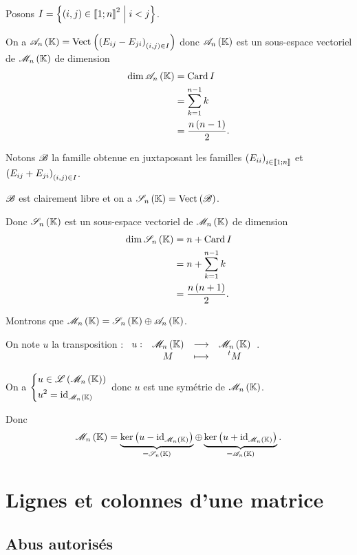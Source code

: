 \begin{dem}
Posons \(I=\left\lbrace\left(i,j\right)\in\left\llbracket1;n\right\rrbracket^2\;\middle|\; i<j\right\rbrace\).

On a \(\antisym{n}=\Vect{\paren{E_{ij}-E_{ji}}_{\paren{i,j}\in I}}\) donc \(\antisym{n}\) est un sous-espace vectoriel de \(\M{n}\) de dimension \[\begin{aligned}
\dim\antisym{n}&=\Card I \\
&=\sum_{k=1}^{n-1}k \\
&=\dfrac{n\paren{n-1}}{2}.
\end{aligned}\]

Notons \(\mathscr{B}\) la famille obtenue en juxtaposant les familles \(\left(E_{ii}\right)_{i\in\left\llbracket1;n\right\rrbracket}\) et \(\left(E_{ij}+E_{ji}\right)_{\left(i,j\right)\in I}\).

\(\mathscr{B}\) est clairement libre et on a \(\sym{n}=\Vect{\fami{B}}\).

Donc \(\sym{n}\) est un sous-espace vectoriel de \(\M{n}\) de dimension \[\begin{aligned}
\dim\sym{n}&=n+\Card I \\
&=n+\sum_{k=1}^{n-1}k \\
&=\dfrac{n\paren{n+1}}{2}.
\end{aligned}\]

Montrons que \(\M{n}=\sym{n}\oplus\antisym{n}\).

On note \(u\) la transposition : \(\fonction{u}{\M{n}}{\M{n}}{M}{\trans{M}}\).

On a \(\begin{dcases}
u\in\Lendo{\M{n}} \\
u^2=\id{\M{n}}
\end{dcases}\) donc \(u\) est une symétrie de \(\M{n}\).

Donc \[\M{n}=\underbrace{\ker\paren{u-\id{\M{n}}}}_{=\sym{n}}\oplus\underbrace{\ker\paren{u+\id{\M{n}}}}_{=\antisym{n}}.\]
\end{dem}

\section{Lignes et colonnes d'une matrice}

\subsection{Abus autorisés}

